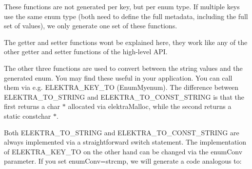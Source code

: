 \begin{DoxyCode}{0}
\DoxyCodeLine{}
\end{DoxyCode}


These functions are not generated per key, but per enum type. If multiple keys use the same enum type (both need to define the full metadata, including the full set of values), we only generate one set of these functions.

The getter and setter functions won\textquotesingle{}t be explained here, they work like any of the other getter and setter functions of the high-\/level A\+PI.

The other three functions are used to convert between the string values and the generated {\ttfamily enum}. You may find these useful in your application. You can call them via e.\+g. {\ttfamily E\+L\+E\+K\+T\+R\+A\+\_\+\+K\+E\+Y\+\_\+\+TO (Enum\+Myenum)}. The difference between {\ttfamily E\+L\+E\+K\+T\+R\+A\+\_\+\+T\+O\+\_\+\+S\+T\+R\+I\+NG} and {\ttfamily E\+L\+E\+K\+T\+R\+A\+\_\+\+T\+O\+\_\+\+C\+O\+N\+S\+T\+\_\+\+S\+T\+R\+I\+NG} is that the first returns a {\ttfamily char $\ast$} allocated via {\ttfamily elektra\+Malloc}, while the second returns a static {\ttfamily constchar $\ast$}.

Both {\ttfamily E\+L\+E\+K\+T\+R\+A\+\_\+\+T\+O\+\_\+\+S\+T\+R\+I\+NG} and {\ttfamily E\+L\+E\+K\+T\+R\+A\+\_\+\+T\+O\+\_\+\+C\+O\+N\+S\+T\+\_\+\+S\+T\+R\+I\+NG} are always implemented via a straightforward {\ttfamily switch} statement. The implementation of {\ttfamily E\+L\+E\+K\+T\+R\+A\+\_\+\+K\+E\+Y\+\_\+\+TO} on the other hand can be changed via the {\ttfamily enum\+Conv} parameter. If you set {\ttfamily enum\+Conv=strcmp}, we will generate a code analogous to\+:


\begin{DoxyCode}{0}
\end{DoxyCode}


